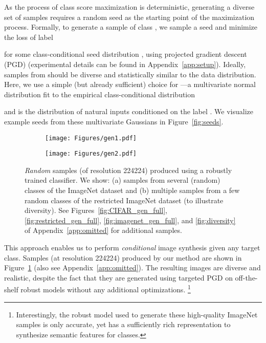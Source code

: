 \documentclass{article}
\begin{document}
As the process of class score maximization is deterministic, generating a diverse set of samples requires a random
seed as the starting point of the maximization process. 
Formally, to generate a sample of class , we sample a seed and minimize the
loss  of label 

 for some class-conditional seed distribution , using projected gradient descent (PGD)
(experimental details can be found in Appendix~\ref{app:setup}). 
Ideally, samples from  should be diverse and  
statistically similar to the data distribution. Here, we use 
a simple (but already sufficient) choice for ---a multivariate normal
distribution fit to the empirical class-conditional distribution

and  is the distribution of natural inputs conditioned on the label
.
We visualize example seeds from these multivariate Gaussians in
Figure~\ref{fig:seeds}.
\begin{figure}[!h]
    \begin{subfigure}[b]{1\textwidth}
	\texttt{[image: Figures/gen1.pdf]}
    \caption{}
    \end{subfigure}
    \begin{subfigure}[b]{1\textwidth}
	\texttt{[image: Figures/gen2.pdf]}
    \caption{}
	\end{subfigure}
    \caption{{\em Random} samples (of resolution 224224) produced using 
        a robustly trained classifier. We show: (a) samples from several (random) 
        classes of the ImageNet dataset and (b) multiple samples from a few
        random classes of the restricted ImageNet dataset (to illustrate
        diversity). See Figures~\ref{fig:CIFAR_gen_full},
        \ref{fig:restricted_gen_full}, \ref{fig:imagenet_gen_full}, 
        and \ref{fig:diversity} of Appendix~\ref{app:omitted} for additional 
        samples.}
	\label{fig:generation}
\end{figure}

This approach enables us to perform
\emph{conditional} image synthesis given any target class.
Samples (at resolution 224224) produced by our method are shown in 
Figure~\ref{fig:generation} (also see Appendix~\ref{app:omitted}).
The resulting images are diverse
and  realistic, despite the fact that they are
generated using targeted PGD on off-the-shelf
robust models without any additional optimizations.
\footnote{Interestingly, the robust model used to generate
these high-quality ImageNet samples is only  
accurate, yet has a sufficiently rich representation to synthesize 
semantic features for  classes.}
\end{document}
